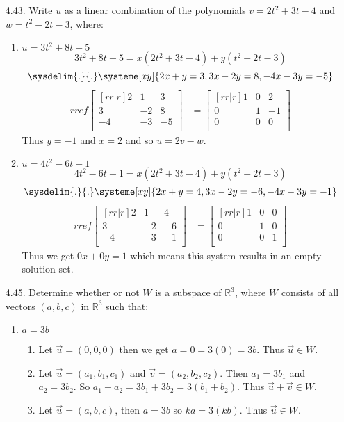\documentclass[12pt]{article}
\begin{document}
\begin{enumerate}
\begin{enumerate}
	\end{enumerate}
	
\item[4.43.] Write $u$ as a linear combination of the polynomials $v=2t^2+3t-4$ and $w=t^2-2t-3$, where:
	\begin{enumerate}
	\item $u=3t^2+8t-5$\\
	\[ 3t^2+8t-5=x(2t^2+3t-4)+y(t^2-2t-3) \]
	\[ \sysdelim{.}{.}\systeme[xy]{2x+y=3,3x-2y=8,-4x-3y=-5} \]
	\begin{align*}
	rref\begin{bmatrix}[rr|r] 2&1&3\\3&-2&8\\-4&-3&-5\\ \end{bmatrix}
	&= \begin{bmatrix}[rr|r] 1&0&2\\0&1&-1\\0&0&0\\ \end{bmatrix}
	\end{align*}
	Thus $y=-1$ and $x=2$ and so $u = 2v-w$.

	\item $u=4t^2-6t-1$\\
	\[ 4t^2-6t-1=x(2t^2+3t-4)+y(t^2-2t-3) \]
	\[ \sysdelim{.}{.}\systeme[xy]{2x+y=4,3x-2y=-6,-4x-3y=-1} \]
	\begin{align*}
	rref\begin{bmatrix}[rr|r] 2&1&4\\3&-2&-6\\-4&-3&-1\\ \end{bmatrix}
	&= 	\begin{bmatrix}[rr|r] 1&0&0\\0&1&0\\0&0&1\\ \end{bmatrix}
	\end{align*}
	Thus we get $0x+0y=1$ which means this system results in an empty solution set.
	\end{enumerate}
	
\item[4.45.] Determine whether or not $W$ is a subspace of $\mathbb{R}^3$, where $W$ consists of all vectors $(a,b,c)$ in $\mathbb{R}^3$ such that:
	\begin{enumerate}
	\item $a=3b$
		\begin{enumerate}
		\item Let $\vec{u}=(0,0,0)$ then we get $a=0=3(0)=3b$. Thus $\vec{u} \in W$.
		\item Let $\vec{u}=(a_1,b_1,c_1)$ and $\vec{v}=(a_2,b_2,c_2)$. Then $a_1=3b_1$ and $a_2=3b_2$. So $a_1+a_2 = 3b_1 +3b_2 = 3(b_1+b_2)$. Thus $\vec{u}+\vec{v} \in W$.
		\item Let $\vec{u}=(a,b,c)$, then $a=3b$ so $ka=3(kb)$. Thus $\vec{u} \in W$.
		\end{enumerate}


\end{enumerate}
\end{enumerate}
\end{document}
